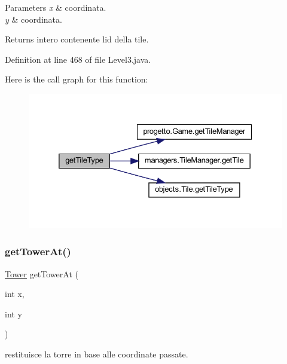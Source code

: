 \begin{DoxyParams}{Parameters}
{\em x} & coordinata. \\
\hline
{\em y} & coordinata.\\
\hline
\end{DoxyParams}
\begin{DoxyReturn}{Returns}
intero contenente l\textquotesingle{}id della tile. 
\end{DoxyReturn}


Definition at line 468 of file Level3.\+java.

Here is the call graph for this function\+:
\nopagebreak
\begin{figure}[H]
\begin{center}
\leavevmode
\includegraphics[width=332pt]{classscenes_1_1_level3_ac689e72523c8460ac3160526d310b1b7_cgraph}
\end{center}
\end{figure}
\mbox{\label{classscenes_1_1_level3_a4345f2e80059788e5ab1dd1cf0ff2c04}} 
\subsubsection{\texorpdfstring{get\+Tower\+At()}{getTowerAt()}}
{\footnotesize\ttfamily \hyperlink{classtowers_1_1_tower}{Tower} get\+Tower\+At (\begin{DoxyParamCaption}\item[{int}]{x,  }\item[{int}]{y }\end{DoxyParamCaption})\hspace{0.3cm}{\ttfamily [private]}}



restituisce la torre in base alle coordinate passate. 


